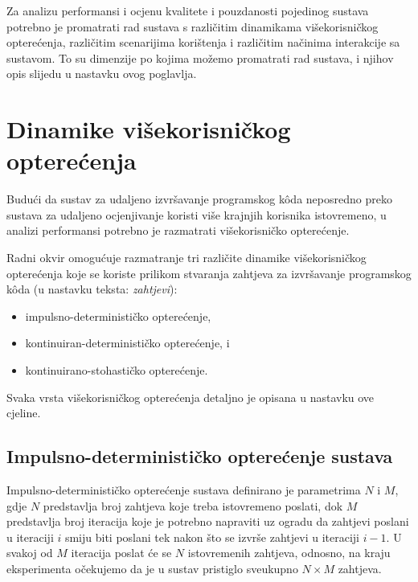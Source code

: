 \documentclass[times, utf8, diplomski]{fer}
\begin{document}
Za analizu performansi i ocjenu kvalitete i pouzdanosti pojedinog sustava potrebno je promatrati rad sustava s različitim dinamikama višekorisničkog opterećenja, različitim scenarijima korištenja i različitim načinima interakcije sa sustavom. To su dimenzije po kojima možemo promatrati rad sustava, i njihov opis slijedu u nastavku ovog poglavlja.

\section{Dinamike višekorisničkog opterećenja}
Budući da sustav za udaljeno izvršavanje programskog kôda neposredno preko sustava za udaljeno ocjenjivanje koristi više krajnjih korisnika istovremeno, u analizi performansi potrebno je razmatrati višekorisničko opterećenje.

Radni okvir omogućuje razmatranje tri različite dinamike višekorisničkog opterećenja koje se koriste prilikom stvaranja zahtjeva za izvršavanje programskog kôda (u nastavku teksta: \textit{zahtjevi}):
\begin{itemize}
    \item impulsno-determinističko opterećenje,
    \item kontinuiran-determinističko opterećenje, i
    \item kontinuirano-stohastičko opterećenje.
\end{itemize}

Svaka vrsta višekorisničkog opterećenja detaljno je opisana u nastavku ove cjeline. 

\subsection{Impulsno-determinističko opterećenje sustava}
\label{subsec:id-load}
Impulsno-determinističko opterećenje sustava definirano je parametrima $N$ i $M$, gdje $N$ predstavlja broj zahtjeva koje treba istovremeno poslati, dok $M$ predstavlja broj iteracija koje je potrebno napraviti uz ogradu da zahtjevi poslani u iteraciji $i$ smiju biti poslani tek nakon što se izvrše zahtjevi u iteraciji $i - 1$. U svakoj od $M$ iteracija poslat će se $N$ istovremenih zahtjeva, odnosno, na kraju eksperimenta očekujemo da je u sustav pristiglo sveukupno $N \times M$ zahtjeva.
\end{document}

